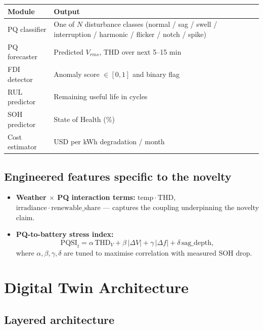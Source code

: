 \documentclass[11pt,a4paper]{article}
\begin{document}
\begin{table}[H]
\centering
\small
\begin{tabular}{p{3.8cm}p{10.0cm}}
\toprule
\textbf{Module} & \textbf{Output} \\
\midrule
PQ classifier   & One of $N$ disturbance classes (normal / sag / swell /
                  interruption / harmonic / flicker / notch / spike) \\
PQ forecaster   & Predicted $V_{rms}$, $\mathrm{THD}$ over next 5--15 min \\
FDI detector    & Anomaly score $\in [0,1]$ and binary flag \\
RUL predictor   & Remaining useful life in cycles \\
SOH predictor   & State of Health (\%) \\
Cost estimator  & USD per kWh degradation / month \\
\bottomrule
\end{tabular}
\end{table}

\subsection{Engineered features specific to the novelty}

\begin{itemize}[leftmargin=1.4em]
    \item \textbf{Weather $\times$ PQ interaction terms:}
        $\mathrm{temp}\cdot\mathrm{THD}$, $\mathrm{irradiance}\cdot\mathrm{renewable\_share}$
        --- captures the coupling underpinning the novelty claim.
    \item \textbf{PQ-to-battery stress index:}
        \[
            \mathrm{PQSI}_t = \alpha\,\mathrm{THD}_V + \beta\,|\Delta V| +
            \gamma\,|\Delta f| + \delta\,\mathrm{sag\_depth},
        \]
        where $\alpha,\beta,\gamma,\delta$ are tuned to maximise
        correlation with measured SOH drop.
\end{itemize}

\section{Digital Twin Architecture}
\label{sec:dt}

\subsection{Layered architecture}
\end{document}
